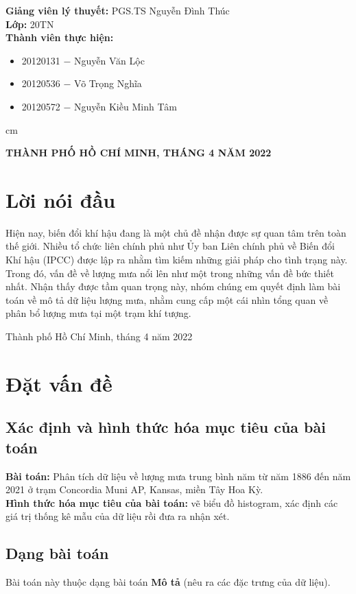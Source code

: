 \documentclass[a4paper]{article}
\begin{document}
\begin{titlepage}
\begin{mybox}
\textbf{Giảng viên lý thuyết:} PGS.TS Nguyễn Đình Thúc\\
\textbf{Lớp:} 20TN\\
\textbf{Thành viên thực hiện:}
\begin{itemize}
\item 20120131 $-$ Nguyễn Văn Lộc
\item 20120536 $-$ Võ Trọng Nghĩa
\item 20120572 $-$ Nguyễn Kiều Minh Tâm
\end{itemize}
 cm
\begin{center}
\textbf{THÀNH PHỐ HỒ CHÍ MINH, THÁNG 4 NĂM 2022}
\end{center}
\end{mybox}
\end{titlepage}


\section*{Lời nói đầu}
Hiện nay, biến đổi khí hậu đang là một chủ đề nhận được sự quan tâm trên toàn thế giới. Nhiều tổ chức liên chính phủ như Ủy ban Liên chính phủ về Biến đổi Khí hậu (IPCC) được lập ra nhằm tìm kiếm những giải pháp cho tình trạng này. Trong đó, vấn đề về lượng mưa nổi lên như một trong những vấn đề bức thiết nhất. Nhận thấy được tầm quan trọng này, nhóm chúng em quyết định làm bài toán về mô tả dữ liệu lượng mưa, nhằm cung cấp một cái nhìn tổng quan về phân bổ lượng mưa tại một trạm khí tượng.
\begin{flushright}
Thành phố Hồ Chí Minh, tháng 4 năm 2022
\end{flushright} 
\newpage

\tableofcontents
\listoffigures
\listoftables
\newpage


\section{Đặt vấn đề}
\subsection{Xác định và hình thức hóa mục tiêu của bài toán}
\textbf{Bài toán:} Phân tích dữ liệu về lượng mưa trung bình năm từ năm 1886 đến năm 2021 ở trạm Concordia Muni AP, Kansas, miền Tây Hoa Kỳ.\\
\textbf{Hình thức hóa mục tiêu của bài toán:} vẽ biểu đồ histogram, xác định các giá trị thống kê mẫu của dữ liệu rồi đưa ra nhận xét.

\subsection{Dạng bài toán}
Bài toán này thuộc dạng bài toán \textbf{Mô tả} (nêu ra các đặc trưng của dữ liệu).
\end{document}
